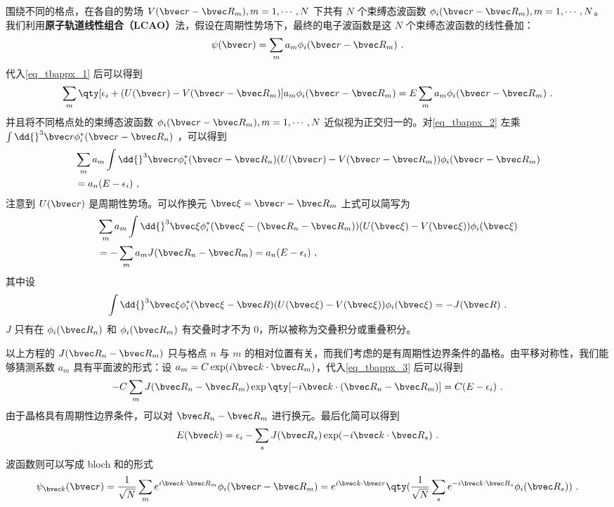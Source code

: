 围绕不同的格点，在各自的势场 $V(\bvec r-\bvec R_m),m=1,\cdots,N$ 下共有 $N$ 个束缚态波函数 $\phi_i(\bvec r-\bvec R_m),m=1,\cdots,N$。我们利用\textbf{原子轨道线性组合（LCAO）}法，假设在周期性势场下，最终的电子波函数是这 $N$ 个束缚态波函数的线性叠加：
\begin{equation}
\psi(\bvec r)=\sum_{m} a_m \phi_i(\bvec r-\bvec R_m)~.
\end{equation}
代入\autoref{eq_tbappx_1} 后可以得到
\begin{equation}\label{eq_tbappx_2}
\sum_{m}\qty[\epsilon_i+(U(\bvec r)-V(\bvec r-\bvec R_m)]a_m\phi_i(\bvec r-\bvec R_m)=E\sum_{m} a_m\phi_i(\bvec r-\bvec R_m)~.
\end{equation}
并且将不同格点处的束缚态波函数 $\phi_i(\bvec r-\bvec R_m),m=1,\cdots,N$ 近似视为正交归一的。对\autoref{eq_tbappx_2} 左乘 $\int \dd{}^3 \bvec r\phi_i^*(\bvec r-\bvec R_n)$ ，可以得到
\begin{equation}
\begin{aligned}
&\sum_m a_m \int \dd{}^3 \bvec r \phi_i^*(\bvec r-\bvec R_n)(U(\bvec r)-V(\bvec r-\bvec R_m))\phi_i(\bvec r-\bvec R_m)\\
&=a_n(E-\epsilon_i)~,
\end{aligned}
\end{equation}
注意到 $U(\bvec r)$ 是周期性势场。可以作换元  $\bvec \xi=\bvec r-\bvec R_m$ 上式可以简写为
\begin{equation}\label{eq_tbappx_3}
\begin{aligned}
&\sum_m a_m \int \dd{}^3 \bvec \xi \phi_i^*(\bvec \xi-(\bvec R_n-\bvec R_m))(U(\bvec \xi)-V(\bvec \xi))\phi_i(\bvec \xi)
\\
&=-\sum_m a_m J(\bvec R_n-\bvec R_m)=a_n(E-\epsilon_i)~,
\end{aligned}
\end{equation}
其中设
\begin{equation}\label{eq_tbappx_5}
\int \dd{}^3 \bvec \xi \phi_i^*(\bvec \xi-\bvec R)(U(\bvec \xi)-V(\bvec \xi))\phi_i(\bvec \xi)=-J(\bvec R)~.
\end{equation}
$J$ 只有在 $\phi_i(\bvec R_n)$ 和 $\phi_i(\bvec R_m)$ 有交叠时才不为 $0$，所以被称为交叠积分或重叠积分。

以上方程的 $J(\bvec R_n-\bvec R_m)$ 只与格点 $n$ 与 $m$ 的相对位置有关，而我们考虑的是有周期性边界条件的晶格。由平移对称性，我们能够猜测系数 $a_m$ 具有平面波的形式：设 $a_m=C\exp(i \bvec k\cdot \bvec R_m)$，代入\autoref{eq_tbappx_3} 后可以得到
\begin{equation}
-C\sum_m J(\bvec R_n-\bvec R_m)\exp\qty[-i\bvec k\cdot (\bvec R_n-\bvec R_m)]=C(E-\epsilon_i)~.
\end{equation}
由于晶格具有周期性边界条件，可以对 $\bvec R_n-\bvec R_m$ 进行换元。最后化简可以得到
\begin{equation}\label{eq_tbappx_4}
E(\bvec k)=\epsilon_i-\sum_s J(\bvec R_s)\exp(-i\bvec k\cdot \bvec R_s)~.
\end{equation}
波函数则可以写成 bloch 和的形式
\begin{equation}
\psi_{\bvec k}(\bvec r)=\frac{1}{\sqrt{N}}\sum_m e^{i\bvec k\cdot \bvec R_m}\phi_i(\bvec r-\bvec R_m)=e^{i\bvec k\cdot \bvec r}\qty(\frac{1}{\sqrt{N}}\sum_s e^{-i\bvec k\cdot \bvec R_s}\phi_i(\bvec R_s))~.
\end{equation}

